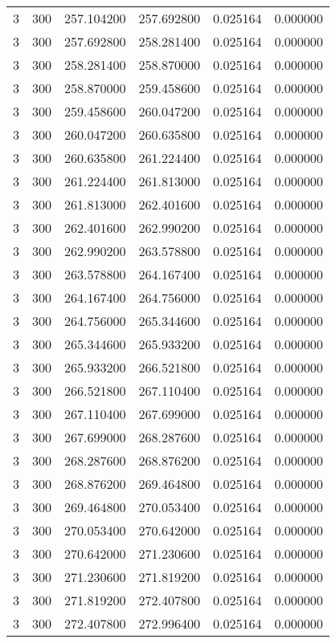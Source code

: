 \begin{longtable}{rrrrrr}
3 & 300 & 257.104200 & 257.692800 & 0.025164 & 0.000000 \\
3 & 300 & 257.692800 & 258.281400 & 0.025164 & 0.000000 \\
3 & 300 & 258.281400 & 258.870000 & 0.025164 & 0.000000 \\
3 & 300 & 258.870000 & 259.458600 & 0.025164 & 0.000000 \\
3 & 300 & 259.458600 & 260.047200 & 0.025164 & 0.000000 \\
3 & 300 & 260.047200 & 260.635800 & 0.025164 & 0.000000 \\
3 & 300 & 260.635800 & 261.224400 & 0.025164 & 0.000000 \\
3 & 300 & 261.224400 & 261.813000 & 0.025164 & 0.000000 \\
3 & 300 & 261.813000 & 262.401600 & 0.025164 & 0.000000 \\
3 & 300 & 262.401600 & 262.990200 & 0.025164 & 0.000000 \\
3 & 300 & 262.990200 & 263.578800 & 0.025164 & 0.000000 \\
3 & 300 & 263.578800 & 264.167400 & 0.025164 & 0.000000 \\
3 & 300 & 264.167400 & 264.756000 & 0.025164 & 0.000000 \\
3 & 300 & 264.756000 & 265.344600 & 0.025164 & 0.000000 \\
3 & 300 & 265.344600 & 265.933200 & 0.025164 & 0.000000 \\
3 & 300 & 265.933200 & 266.521800 & 0.025164 & 0.000000 \\
3 & 300 & 266.521800 & 267.110400 & 0.025164 & 0.000000 \\
3 & 300 & 267.110400 & 267.699000 & 0.025164 & 0.000000 \\
3 & 300 & 267.699000 & 268.287600 & 0.025164 & 0.000000 \\
3 & 300 & 268.287600 & 268.876200 & 0.025164 & 0.000000 \\
3 & 300 & 268.876200 & 269.464800 & 0.025164 & 0.000000 \\
3 & 300 & 269.464800 & 270.053400 & 0.025164 & 0.000000 \\
3 & 300 & 270.053400 & 270.642000 & 0.025164 & 0.000000 \\
3 & 300 & 270.642000 & 271.230600 & 0.025164 & 0.000000 \\
3 & 300 & 271.230600 & 271.819200 & 0.025164 & 0.000000 \\
3 & 300 & 271.819200 & 272.407800 & 0.025164 & 0.000000 \\
3 & 300 & 272.407800 & 272.996400 & 0.025164 & 0.000000 \\

\end{longtable}
